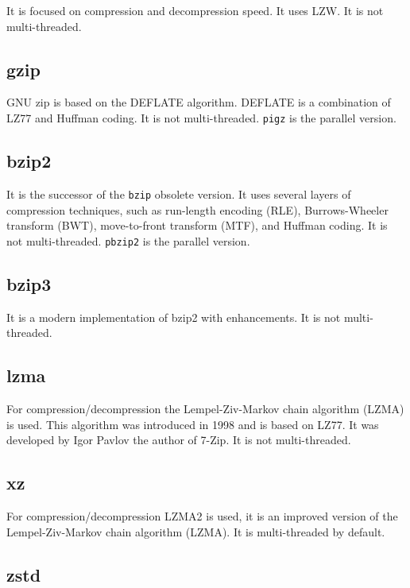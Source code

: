 \documentclass[12pt, a4paper]{report}
\begin{document}
It is focused on compression and decompression speed.
It uses LZW.
It is not multi-threaded.

\subsection{gzip}
\label{subsec:gzip}

GNU zip is based on the DEFLATE algorithm.
DEFLATE is a combination of LZ77 and Huffman coding.
It is not multi-threaded.
\texttt{pigz} is the parallel version.

\subsection{bzip2}
\label{subsec:bzip2}

It is the successor of the \texttt{bzip} obsolete version.
It uses several layers of compression techniques, such as run-length encoding (RLE), Burrows-Wheeler transform (BWT),
move-to-front transform (MTF), and Huffman coding.
It is not multi-threaded.
\texttt{pbzip2} is the parallel version.

\subsection{bzip3}
\label{subsec:bzip3}

It is a modern implementation of bzip2 with enhancements.
It is not multi-threaded.

\subsection{lzma}
\label{subsec:lzma}

For compression/decompression the Lempel-Ziv-Markov chain algorithm (LZMA) is used.
This algorithm was introduced in 1998 and is based on LZ77.
It was developed by Igor Pavlov the author of 7-Zip.
It is not multi-threaded.

\subsection{xz}
\label{subsec:xz}

For compression/decompression LZMA2 is used, it is an improved version of the Lempel-Ziv-Markov chain algorithm (LZMA).
It is multi-threaded by default.

\subsection{zstd}
\label{subsec:zstd}
\end{document}
